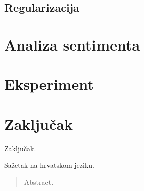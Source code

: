 \documentclass[times, utf8, zavrsni, numeric]{fer}
\begin{document}
\section{Regularizacija} \label{reg}

\chapter{Analiza sentimenta} \label{sentiment}

\chapter{Eksperiment} \label{eksperiment}

\chapter{Zaključak} \label{zakljucak}
Zaključak.




\begin{sazetak}
Sažetak na hrvatskom jeziku.

\end{sazetak}

\begin{abstract}
Abstract.

\end{abstract}
\end{document}
